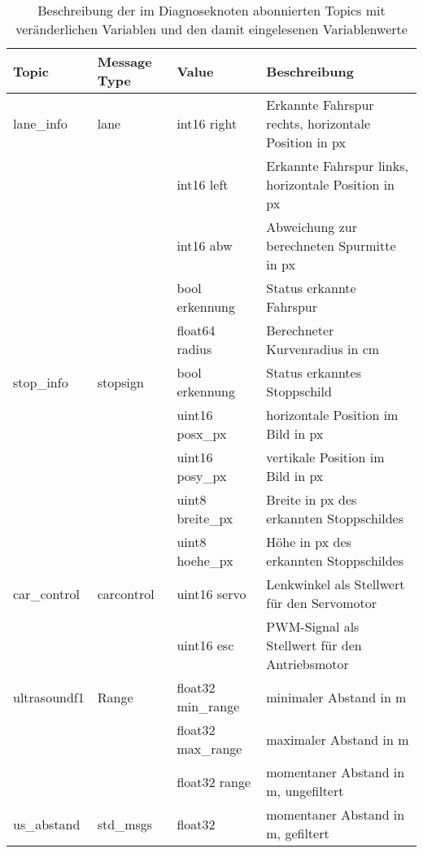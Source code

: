 \begin{table}[!htb]
	\centering
	\caption{Beschreibung der im Diagnoseknoten abonnierten Topics mit veränderlichen Variablen und den damit eingelesenen Variablenwerte}
	\footnotesize
	\renewcommand{\arraystretch}{1.3}
	\begin{tabular}{l l l p{6.5cm}}
		\toprule
		Topic        & Message Type & Value              & Beschreibung                                         \\ \midrule
		lane\_info   & lane         & int16 right        & Erkannte Fahrspur rechts, \newline horizontale Position in px \\
		             &              & int16 left         & Erkannte Fahrspur links, \newline horizontale Position in px  \\
		             &              & int16 abw          & Abweichung zur berechneten Spurmitte in px           \\
		             &              & bool erkennung     & Status erkannte Fahrspur                             \\
		             &              & float64 radius     & Berechneter Kurvenradius in cm                       \\ \midrule
		stop\_info   & stopsign     & bool erkennung     & Status erkanntes Stoppschild                         \\
		             &              & uint16 posx\_px    & horizontale Position im Bild in px                   \\
		             &              & uint16 posy\_px    & vertikale Position im Bild in px                     \\
		             &              & uint8 breite\_px   & Breite in px des erkannten Stoppschildes             \\
		             &              & uint8 hoehe\_px    & Höhe in px des erkannten Stoppschildes               \\ \midrule
		car\_control & carcontrol   & uint16 servo       & Lenkwinkel als Stellwert für den Servomotor     \\
		             &              & uint16 esc         & PWM-Signal als Stellwert für den Antriebsmotor         \\ \midrule
		ultrasoundf1 & Range        & float32 min\_range & minimaler Abstand in m                               \\
		             &              & float32 max\_range & maximaler Abstand in m                               \\
		             &              & float32 range      & momentaner Abstand in m, ungefiltert                               \\
		             \midrule
 		us\_abstand & std\_msgs		& float32 			 &  momentaner Abstand in m, gefiltert 								\\
		              \bottomrule
	\end{tabular}
	\label{tab:ROSmessagesDynamischBeschreibung}
\end{table}

